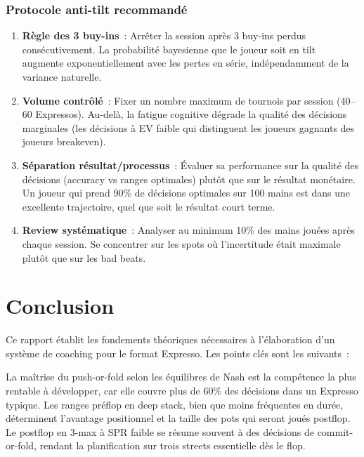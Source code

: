 \documentclass[a4paper,11pt]{article}
\begin{document}
\subsubsection{Protocole anti-tilt recommand\'e}

\begin{enumerate}[leftmargin=*]
\item \textbf{R\`egle des 3 buy-ins}~: Arr\^eter la session apr\`es 3 buy-ins perdus cons\'ecutivement. La probabilit\'e bayesienne que le joueur soit en tilt aug\-mente exponentiellement avec les pertes en s\'erie, ind\'ependamment de la variance naturelle.

\item \textbf{Volume contr\^ol\'e}~: Fixer un nombre maximum de tournois par session (40--60 Expressos). Au-del\`a, la fatigue cognitive d\'egrade la qualit\'e des d\'ecisions marginales (les d\'ecisions \`a EV faible qui distinguent les joueurs gagnants des joueurs breakeven).

\item \textbf{S\'eparation r\'esultat/processus}~: \'Evaluer sa performance sur la qualit\'e des d\'ecisions (accuracy vs ranges optimales) plut\^ot que sur le r\'esultat mon\'etaire. Un joueur qui prend 90\% de d\'ecisions optimales sur 100 mains est dans une excellente trajectoire, quel que soit le r\'esultat court terme.

\item \textbf{Review syst\'ematique}~: Analyser au minimum 10\% des mains jou\'ees apr\`es chaque session. Se concentrer sur les spots o\`u l'incertitude \'etait maximale plut\^ot que sur les bad beats.
\end{enumerate}


\newpage
\section*{Conclusion}

Ce rapport \'etablit les fondements th\'eoriques n\'ecessaires \`a l'\'elaboration d'un syst\`eme de coaching pour le format Expresso. Les points cl\'es sont les suivants~:

La ma\^itrise du push-or-fold selon les \'equilibres de Nash est la comp\'etence la plus rentable \`a d\'evelopper, car elle couvre plus de 60\% des d\'ecisions dans un Expresso typique. Les ranges pr\'eflop en deep stack, bien que moins fr\'equentes en dur\'ee, d\'eterminent l'avantage positionnel et la taille des pots qui seront jou\'es postflop. Le postflop en 3-max \`a SPR faible se r\'esume souvent \`a des d\'ecisions de commit-or-fold, rendant la planification sur trois streets essentielle d\`es le flop.
\end{document}
